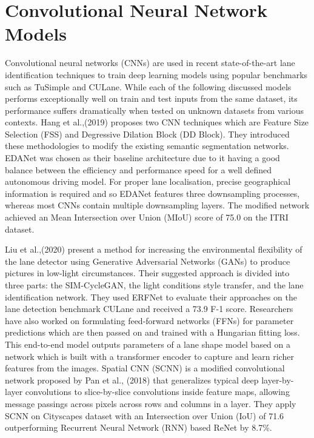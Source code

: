 \section{Convolutional Neural Network Models}
Convolutional neural networks (CNNs) are used in recent state-of-the-art lane identification techniques to train deep learning models using popular benchmarks such as TuSimple\cite{noauthor_tusimple_2021} and CULane\cite{CULane_Dataset}. While each of the following discussed models performs exceptionally well on train and test inputs from the same dataset, its performance suffers dramatically when tested on unknown datasets from various contexts.
Hang et al.,(2019)\cite{lo_multi-class_2019} proposes two CNN techniques which are Feature Size
Selection (FSS) and Degressive Dilation Block (DD Block). They introduced these methodologies to modify the existing semantic segmentation networks. EDANet\cite{lo2019efficient} was chosen as their baseline architecture due to it having a good balance between the efficiency and performance speed for a well defined autonomous driving model. For proper lane localisation, precise geographical information is required and so EDANet features three downsampling processes, whereas most CNNs contain multiple downsampling layers. The modified network achieved an Mean Intersection over Union (MIoU) score of 75.0 on the ITRI dataset.\cite{lo_multi-class_2019} 

Liu et al.,(2020)\cite{liu_lane_2020} present a method for increasing the environmental flexibility of the lane detector using Generative Adversarial Networks (GANs) to produce pictures in low-light circumstances. Their suggested approach is divided into three parts: the SIM-CycleGAN, the light conditions style transfer, and the lane identification network. They used ERFNet to evaluate their approaches on the lane detection benchmark CULane and received a 73.9 F-1 score.
Researchers have also worked on formulating feed-forward networks (FFNs) for parameter predictions which are then passed on and trained with a Hungarian fitting loss.\cite{liu_end--end_2020} This end-to-end model outputs parameters of a lane shape model based on a network which is built with a transformer encoder to capture and learn richer features from the images.  
Spatial CNN (SCNN) is a modified convolutional network proposed by Pan et al., (2018)\cite{pan_spatial_2017} that generalizes typical deep layer-by-layer convolutions to slice-by-slice convolutions inside feature maps, allowing message passings across pixels across rows and columns in a layer. They apply SCNN on Cityscapes dataset with an Intersection over Union (IoU) of 71.6 outperforming Recurrent Neural Network (RNN) based ReNet by 8.7\%. 

